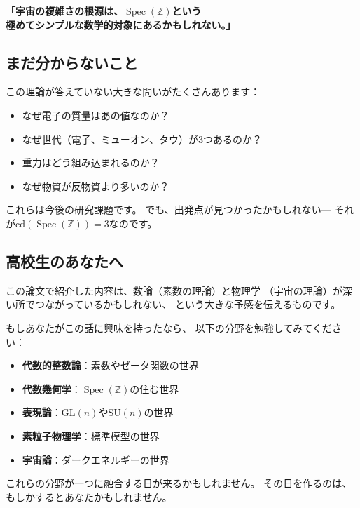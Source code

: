 \documentclass[12pt,a4paper]{article}
\newcommand{\Spec}{\operatorname{Spec}}
\begin{document}
\begin{center}
\textbf{「宇宙の複雑さの根源は、$\Spec(\mathbb{Z})$という\\
極めてシンプルな数学的対象にあるかもしれない。」}
\end{center}

\subsection{まだ分からないこと}

この理論が答えていない大きな問いがたくさんあります：
\begin{itemize}
  \item なぜ電子の質量はあの値なのか？
  \item なぜ世代（電子、ミューオン、タウ）が3つあるのか？
  \item 重力はどう組み込まれるのか？
  \item なぜ物質が反物質より多いのか？
\end{itemize}

これらは今後の研究課題です。
でも、出発点が見つかったかもしれない---
それが$\mathrm{cd}(\Spec(\mathbb{Z})) = 3$なのです。

\subsection{高校生のあなたへ}

\begin{tcolorbox}[colback=blue!3!white, colframe=blue!40!black,
  fonttitle=\bfseries, title={数学と物理学の未来}]
この論文で紹介した内容は、数論（素数の理論）と物理学
（宇宙の理論）が深い所でつながっているかもしれない、
という大きな予感を伝えるものです。

もしあなたがこの話に興味を持ったなら、
以下の分野を勉強してみてください：
\begin{itemize}
  \item \textbf{代数的整数論}：素数やゼータ関数の世界
  \item \textbf{代数幾何学}：$\Spec(\mathbb{Z})$の住む世界
  \item \textbf{表現論}：$\mathrm{GL}(n)$や$\mathrm{SU}(n)$の世界
  \item \textbf{素粒子物理学}：標準模型の世界
  \item \textbf{宇宙論}：ダークエネルギーの世界
\end{itemize}

これらの分野が一つに融合する日が来るかもしれません。
その日を作るのは、もしかするとあなたかもしれません。
\end{tcolorbox}
\end{document}
